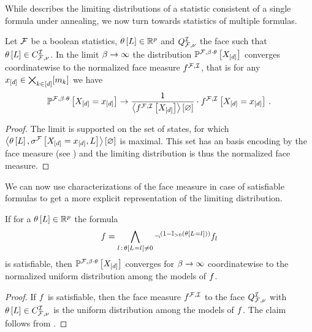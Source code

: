 


\label{sec:hardLogicLimit}

While  describes the limiting distributions of a statistic consistent of a single formula under annealing, we now turn towards statistics of multiple formulas.

\begin{theorem}
    \label{the:limitingDistribution}
    Let $\mathcal{F}$ be a boolean statistics, $\theta\left[L\right]\in\mathbb{R}^{p}$ and $Q^{\mathcal{I}}_{\mathcal{F},\nu}$ the face such that $\theta\left[L\right]\in C_{\mathcal{F},\nu}^{\mathcal{I}}$.
    In the limit $\beta\rightarrow\infty$ the distribution $\mathbb{P}^{\mathcal{F},\beta\cdot\theta}\left[X_{[d]}\right]$ converges coordinatewise to the normalized face measure $f^{\mathcal{F},\mathcal{I}}$, that is for any $x_{[d]}\in\bigtimes_{k\in[d]}[m_{k}]$ we have
    \begin{align*}
        \mathbb{P}^{\mathcal{F},\beta\cdot\theta}\left[X_{[d]}=x_{[d]}\right]
        \rightarrow \frac{1}{\left\langle f^{\mathcal{F},\mathcal{I}}\left[X_{[d]}\right]\right\rangle \left[ \varnothing \right]} \cdot f^{\mathcal{F},\mathcal{I}}\left[X_{[d]}=x_{[d]}\right] \, .
    \end{align*}
\end{theorem}
\begin{proof}
    The limit is supported on the set of states, for which $\left\langle \theta\left[L\right],\sigma^{\mathcal{F}}\left[X_{[d]}=x_{[d]},L\right]\right\rangle \left[ \varnothing \right]$ is maximal.
    This set has an basis encoding by the face measure (see ) and the limiting distribution is thus the normalized face measure.
\end{proof}

We can now use characterizations of the face measure in case of satisfiable formulas to get a more explicit representation of the limiting distribution.

\begin{theorem}
    If for a $\theta\left[L\right]\in\mathbb{R}^{p}$ the formula
    \begin{align*}
        f =
        \bigwedge_{l\,:\,\theta\left[L_{}=l_{}\right]\neq0} \lnot^{(1-\mathbb{I}_{>0}\left(\theta\left[L_{}=l_{}\right]\right))} f_{l}
    \end{align*}
    is satisfiable, then $\mathbb{P}^{\mathcal{F},\beta\cdot\theta}\left[X_{[d]}\right]$ converges for $\beta\rightarrow\infty$ coordinatewise to the normalized uniform distribution among the models of $f$.
\end{theorem}
\begin{proof}
    If $f$ is satisfiable, then the face measure $f^{\mathcal{F},\mathcal{I}}$ to the face $Q^{\mathcal{I}}_{\mathcal{F},\nu}$ with $\theta\left[L\right]\in C_{\mathcal{F},\nu}^{\mathcal{I}}$ is the uniform distribution among the models of $f$.
    The claim follows from .
\end{proof}

